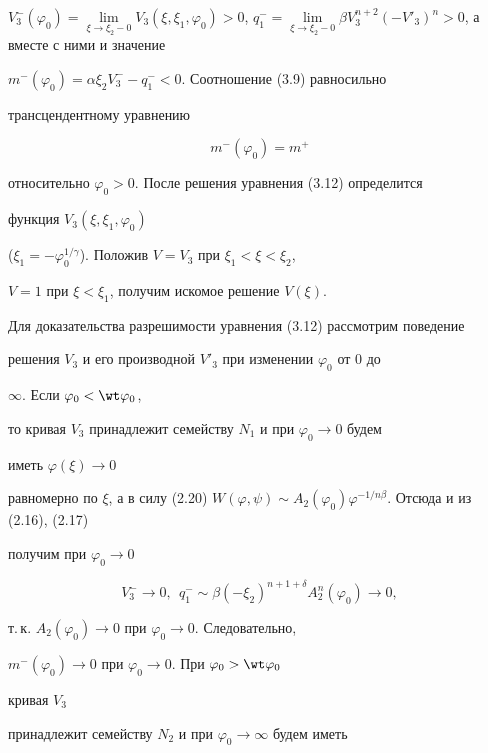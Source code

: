 $V^-_3(\varphi_0)=\lim\limits_{\xi\to\xi_2-0} 


V_3(\xi,\xi_1,\varphi_0)>0$, $q^-_1=\lim\limits_{\xi\to\xi_2-0} \beta 


V^{n+2}_3(-V'_3)^n>0$, а вместе с ними и значение 


$m^-(\varphi_0)=\alpha\xi_2V^-_3-q^-_1<0$. Соотношение (3.9) равносильно 


трансцендентному уравнению 


\begin{equation} 


m^-(\varphi_0)=m^+ \tag{3.12} 


\end{equation} 


относительно $\varphi_0>0$. После решения уравнения (3.12) определится 


функция $V_3(\xi,\xi_1,\varphi_0)$ 


($\xi_1=-\varphi^{1/\gamma}_0$). Положив $V=V_3$ при $\xi_1<\xi<\xi_2$, 


$V=1$ при $\xi<\xi_1$, получим искомое решение $V(\xi)$. 


 


Для доказательства разрешимости уравнения (3.12) рассмотрим поведение 


решения $V_3$ и его производной $V'_3$ при изменении $\varphi_0$ от 0 до 


$\infty$. Если $\varphi_0<\wt\varphi_0$, 


то кривая $V_3$ принадлежит семейству $N_1$ и при $\varphi_0\to0$ будем 


иметь $\varphi(\xi)\to0$ 


равномерно по $\xi$, а в силу (2.20)\; $W(\varphi,\psi)\sim 


A_2(\varphi_0)\varphi^{-1/n\beta}$. Отсюда и из (2.16), (2.17) 


получим при $\varphi_0\to0$ 


$$ 


V^-_3\to0,\ \ q^-_1\sim \beta(-\xi_2)^{n+1+\delta} 


A^n_2(\varphi_0)\to0, 


$$ 


т.\,к. $A_2(\varphi_0)\to0$ при $\varphi_0\to0$. Следовательно, 


$m^-(\varphi_0)\to0$ при $\varphi_0\to0$. При $\varphi_0>\wt\varphi_0$ 


кривая $V_3$ 


принадлежит семейству $N_2$ и при $\varphi_0\to\infty$ будем иметь 


